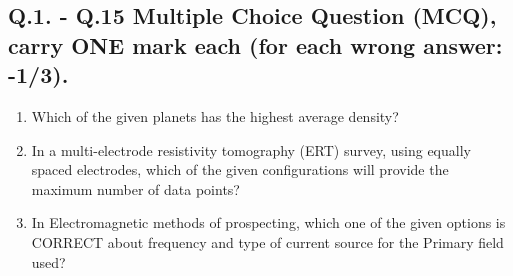 \documentclass[journal,12pt,onecolumn]{IEEEtran}
\theoremstyle{remark}
\begin{document}
\subsection*{Q.1. - Q.15 Multiple Choice Question (MCQ), carry ONE mark each (for each wrong answer: -1/3).}
    \begin{enumerate}
        
    \item Which of the given planets has the highest average density? \hfill{}
        \begin{enumerate}
        \end{enumerate}
    
    \item In a multi-electrode resistivity tomography (ERT) survey, using equally spaced electrodes, which of the given configurations will provide the maximum number of data points?  \hfill{}
        \begin{enumerate}
        \end{enumerate}
    
    \item In Electromagnetic methods of prospecting, which one of the given options is CORRECT about frequency and type of current source for the Primary field used? \hfill{}
        \begin{enumerate}
        \end{enumerate}
    

\end{enumerate}
\end{document}
